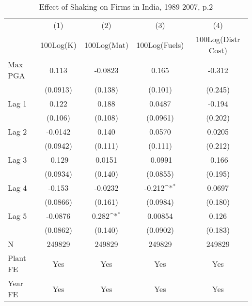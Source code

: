\begin{table}[htbp]\centering
\def\sym#1{\ifmmode^{#1}\else\(^{#1}\)\fi}
\caption{Effect of Shaking on Firms in India, 1989-2007, p.2}
\begin{tabular}{l*{4}{c}}
\toprule
                &\multicolumn{1}{c}{(1)}&\multicolumn{1}{c}{(2)}&\multicolumn{1}{c}{(3)}&\multicolumn{1}{c}{(4)}\\
                &\multicolumn{1}{c}{100Log(K)}&\multicolumn{1}{c}{100Log(Mat)}&\multicolumn{1}{c}{100Log(Fuels)}&\multicolumn{1}{c}{100Log(Distr Cost)}\\
\midrule
Max PGA         &    0.113         &  -0.0823         &    0.165         &   -0.312         \\
                & (0.0913)         &  (0.138)         &  (0.101)         &  (0.245)         \\
\addlinespace
Lag 1           &    0.122         &    0.188         &   0.0487         &   -0.194         \\
                &  (0.106)         &  (0.108)         & (0.0961)         &  (0.202)         \\
\addlinespace
Lag 2           &  -0.0142         &    0.140         &   0.0570         &   0.0205         \\
                & (0.0942)         &  (0.111)         &  (0.111)         &  (0.212)         \\
\addlinespace
Lag 3           &   -0.129         &   0.0151         &  -0.0991         &   -0.166         \\
                & (0.0934)         &  (0.140)         & (0.0855)         &  (0.195)         \\
\addlinespace
Lag 4           &   -0.153         &  -0.0232         &   -0.212\sym{*}  &   0.0697         \\
                & (0.0866)         &  (0.161)         & (0.0984)         &  (0.180)         \\
\addlinespace
Lag 5           &  -0.0876         &    0.282\sym{*}  &  0.00854         &    0.126         \\
                & (0.0862)         &  (0.140)         & (0.0902)         &  (0.183)         \\
\midrule
N               &   249829         &   249829         &   249829         &   249829         \\
Plant FE        &      Yes         &      Yes         &      Yes         &      Yes         \\
Year FE         &      Yes         &      Yes         &      Yes         &      Yes         \\

\end{tabular}
\end{table}
